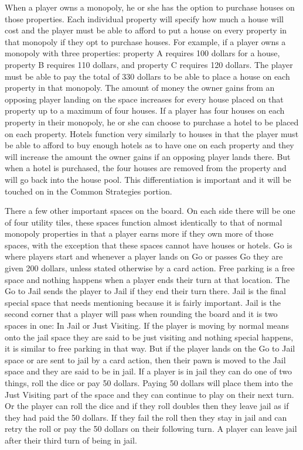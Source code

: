 \documentclass{article}
\begin{document}
	When a player owns a monopoly, he or she has the option to purchase houses on those properties.  Each individual property will specify how much a house will cost and the player must be able to afford to put a house on every property in that monopoly if they opt to purchase houses.  For example, if a player owns a monopoly with three properties: property A requires 100 dollars for a house, property B requires 110 dollars, and property C requires 120 dollars.  The player must be able to pay the total of 330 dollars to be able to place a house on each property in that monopoly.  The amount of money the owner gains from an opposing player landing on the space increases for every house placed on that property up to a maximum of four houses.  If a player has four houses on each property in their monopoly, he or she can choose to purchase a hotel to be placed on each property.  Hotels function very similarly to houses in that the player must be able to afford to buy enough hotels as to have one on each property and they will increase the amount the owner gains if an opposing player lands there. But when a hotel is purchased, the four houses are removed from the property and will go back into the house pool.  This differentiation is important and it will be touched on in the Common Strategies portion.

	There a few other important spaces on the board.  On each side there will be one of four utility tiles, these spaces function almost identically to that of normal monopoly properties in that a player earns more if they own more of those spaces, with the exception that these spaces cannot have houses or hotels.  Go is where players start and whenever a player lands on Go or passes Go they are given 200 dollars, unless stated otherwise by a card action.  Free parking is a free space and nothing happens when a player ends their turn at that location.  The Go to Jail sends the player to Jail if they end their turn there.  Jail is the final special space that needs mentioning because it is fairly important.  Jail is the second corner that a player will pass when rounding the board and it is two spaces in one: In Jail or Just Visiting.  If the player is moving by normal means onto the jail space they are said to be just visiting and nothing special happens, it is similar to free parking in that way. But if the player lands on the Go to Jail space or are sent to jail by a card action, then their pawn is moved to the Jail space and they are said to be in jail.  If a player is in jail they can do one of two things, roll the dice or pay 50 dollars.  Paying 50 dollars will place them into the Just Visiting part of the space and they can continue to play on their next turn.  Or the player can roll the dice and if they roll doubles then they leave jail as if they had paid the 50 dollars.  If they fail the roll then they stay in jail and can retry the roll or pay the 50 dollars on their following turn.  A player can leave jail after their third turn of being in jail.
	
\end{document}

